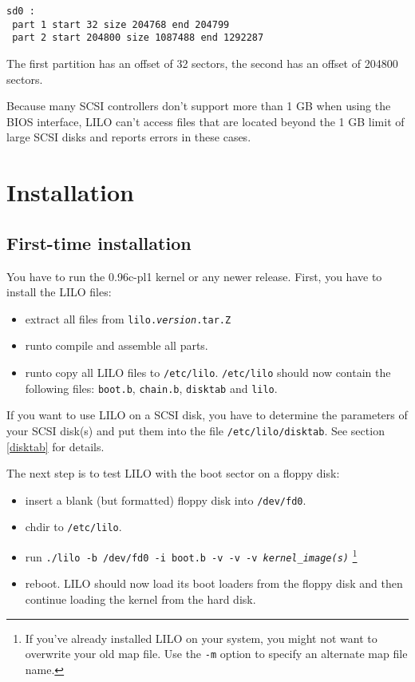 \begin{verbatim}
sd0 :
 part 1 start 32 size 204768 end 204799
 part 2 start 204800 size 1087488 end 1292287
\end{verbatim}

The first partition has an offset of 32 sectors, the second has an
offset of 204800 sectors.

Because many SCSI controllers don't support more than 1 GB when using
the BIOS interface, LILO can't access files that are located beyond the
1 GB limit of large SCSI disks and reports errors in these cases.


\section{Installation}

\subsection{First-time installation}

You have to run the 0.96c-pl1 kernel or any newer release. First, you
have to install the LILO files:

\begin{itemize}
  \item extract all files from {\tt lilo.{\it version}.tar.Z}
  \item run\quad to compile and assemble all parts.
  \item run\quad to copy all LILO files to
     {\tt /etc/lilo}.
     {\tt /etc/lilo} should now contain the following files: {\tt boot.b},
     {\tt chain.b}, {\tt disktab} and {\tt lilo}.
\end{itemize}

If you want to use LILO on a SCSI disk, you have to determine the
parameters of your SCSI disk(s) and put them into the file
{\tt /etc/lilo/disktab}. See section \ref{disktab} for details.

The next step is to test LILO with the boot sector on a floppy disk:

\begin{itemize}
  \item insert a blank (but formatted) floppy disk into {\tt /dev/fd0}.
  \item chdir to {\tt /etc/lilo}.
  \item run {\tt ./lilo -b /dev/fd0 -i boot.b -v -v -v {\it kernel\_image(s)}}%
\footnote{If you've already installed LILO on your system, you might not want
  to overwrite your old map file.
  Use the {\tt -m} option to specify an alternate map file name.}
  \item reboot. LILO should now load its boot loaders from the floppy disk
    and then continue loading the kernel from the hard disk.
\end{itemize}

